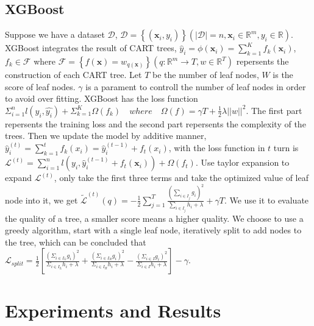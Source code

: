 \documentclass{article}
\begin{document}
\subsection{XGBoost}
Suppose we have a dataset $\mathcal{D}$, $\mathcal{D}=\left\{\left(\mathbf{x}_{i}, y_{i}\right)\right\}\left(|\mathcal{D}|=n, \mathbf{x}_{i} \in \mathbb{R}^{m}, y_{i} \in \mathbb{R}\right)$. XGBoost  integrates the result of CART trees, $\hat{y}_{i}=\phi\left(\mathbf{x}_{i}\right)=\sum_{k=1}^{K} f_{k}\left(\mathbf{x}_{i}\right)$, $f_{k} \in \mathcal{F}$ where  $\mathcal{F}=\left\{f(\mathbf{x})=w_{q(\mathbf{x})}\right\}\left(q: \mathbb{R}^{m} \rightarrow T, w \in \mathbb{R}^{T}\right)$ repersents the construction of each CART tree. Let $T$ be the number of leaf nodes, $W$ is the score of leaf nodes. $\gamma$ is a parament to controll the number of leaf nodes in order to  avoid over fitting. XGBoost has the loss function $\Sigma_{i = 1}^n l(y_i,\hat{y_i})+\Sigma_{k = 1}^K\Omega(f_k) \quad where \quad  \Omega(f) = \gamma T + \frac{1}{2}\lambda \left|\left|w\right|\right| ^2$. The first part repersents the training loss and the second part repersents the complexity of the trees. Then we update the model by additive manner, $\hat{y}_{i}^{(t)}=\sum_{k=1}^{t} f_{k}\left(x_{i}\right)=\hat{y}_{i}^{(t-1)}+f_{t}\left(x_{i}\right)$, with the loss function in $t$ turn is $\mathcal{L}^{(t)}=\sum_{i=1}^{n} l\left(y_{i}, \hat{y}_{i}^{(t-1)}+f_{t}\left(\mathbf{x}_{i}\right)\right)+\Omega\left(f_{t}\right)$. Use taylor expansion to expand $\mathcal{L}^{(t)}$, only take the first three terms and take the optimized value of leaf node into it, we get $\tilde{\mathcal{L}}^{(t)}(q)=-\frac{1}{2} \sum_{j=1}^{T} \frac{\left(\sum_{i \in I_{j}} g_{i}\right)^{2}}{\sum_{i \in I_{j}} h_{i}+\lambda}+\gamma T$. We use it to evaluate the quality of a tree, a smaller score means a higher quality. We choose to use a greedy algorithm, start with a single leaf node, iteratively split to add nodes to the tree, which can be concluded that $\mathcal{L}_{split} = \frac{1}{2} \left[ \frac{\left( \Sigma_{i \in I_{L}} g_i\right) ^2}{\Sigma_{i \in I_{L}} h_i+\lambda} + \frac{\left( \Sigma_{i \in I_{R}} g_i\right) ^2}{\Sigma_{i \in I_{R}} h_i+\lambda} - \frac{\left( \Sigma_{i \in I} g_i\right) ^2}{\Sigma_{i \in I} h_i+\lambda} \right] - \gamma  $.



\section{Experiments and Results}
\end{document}

